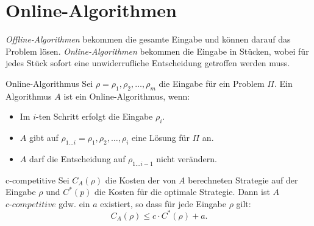 \documentclass{panikzettel}
\begin{document}
\newpage
\section{Online-Algorithmen}
\emph{Offline-Algorithmen} bekommen die gesamte Eingabe und können darauf das Problem lösen. \emph{Online-Algorithmen} bekommen die Eingabe in Stücken, wobei für jedes Stück sofort eine unwiderrufliche Entscheidung getroffen werden muss.

\begin{halfboxl}
\vspace{-\baselineskip}
    \begin{defi}{Online-Algorithmus}
        Sei $\rho=\rho_1,\rho_2, \dots,\rho_m$ die Eingabe für ein Problem $\Pi$.
        Ein Algorithmus $A$ ist ein Online-Algorithmus, wenn:
        \begin{itemize}[nosep]
            \item Im $i$-ten Schritt erfolgt die Eingabe $\rho_i$.
            \item $A$ gibt auf $\rho_{1 \dots i} = \rho_1, \rho_2, \dots, \rho_i$ eine Lösung für $\Pi$ an.
            \item $A$ darf die Entscheidung auf $\rho_{1 \dots i-1}$ nicht verändern.
        \end{itemize}
    \end{defi}
\end{halfboxl}%
\begin{halfboxr}
\vspace{-\baselineskip}
    \begin{defi}{c-competitive}
        Sei $C_A(\rho)$ die Kosten der von $A$ berechneten Strategie auf der Eingabe $\rho$ und $C^*(p)$ die Kosten für die optimale Strategie. Dann ist $A$ $\textit{c-competitive}$ gdw. ein $a$ existiert, so dass für jede Eingabe $\rho$ gilt: $$C_A(\rho) \leq c \cdot C^*(\rho)+a.$$
    \end{defi}
\end{halfboxr}
\end{document}

